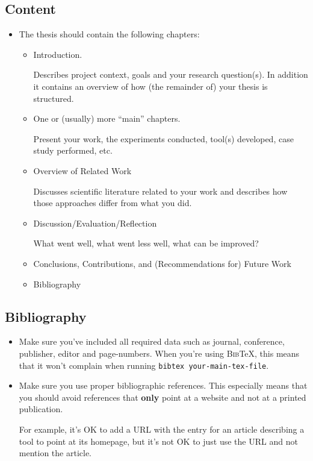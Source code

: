 \subsection{Content}
\begin{itemize}
\item The thesis should contain the following chapters: 

\begin{itemize}
\item Introduction.


Describes project context, goals and your research question(s). In
addition it contains an overview of how (the remainder of) your thesis
is structured.

\item One or (usually) more {}``main'' chapters.


Present your work, the experiments conducted, tool(s) developed, case
study performed, etc.

\item Overview of Related Work


Discusses scientific literature related to your work and describes
how those approaches differ from what you did.

\item Discussion/Evaluation/Reflection


What went well, what went less well, what can be improved?

\item Conclusions, Contributions, and (Recommendations for) Future Work
\item Bibliography
\end{itemize}
\end{itemize}

\subsection{Bibliography}
\begin{itemize}
\item Make sure you've included all required data such as journal, conference,
publisher, editor and page-numbers. When you're using \textsc{Bib}\TeX{},
this means that it won't complain when running \texttt{bibtex your-main-tex-file}.
\item Make sure you use proper bibliographic references. This especially
means that you should avoid references that \textbf{only} point at
a website and not at a printed publication.


For example, it's OK to add a URL with the entry for an article describing
a tool to point at its homepage, but it's not OK to just use the URL
and not mention the article. 

\end{itemize}


